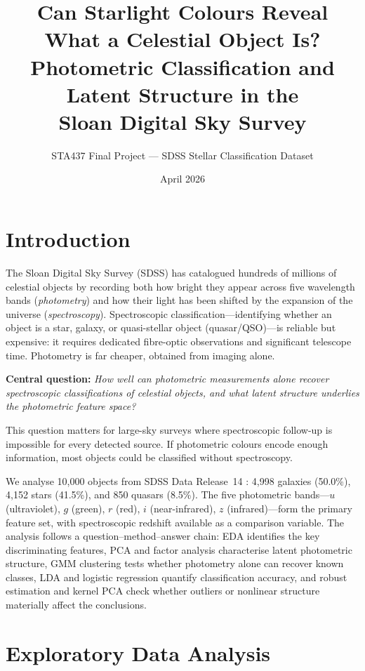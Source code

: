\documentclass[12pt]{article}
\title{\textbf{Can Starlight Colours Reveal What a Celestial Object Is?}\\
\large Photometric Classification and Latent Structure in the\\
Sloan Digital Sky Survey}
\author{STA437 Final Project --- SDSS Stellar Classification Dataset}
\date{April 2026}
\begin{document}
\maketitle
\thispagestyle{fancy}

\section{Introduction}

The Sloan Digital Sky Survey (SDSS) has catalogued hundreds of millions of celestial objects
by recording both how bright they appear across five wavelength bands
(\emph{photometry}) and how their light has been shifted by the expansion of the universe
(\emph{spectroscopy}). Spectroscopic classification---identifying whether an object is a star,
galaxy, or quasi-stellar object (quasar/QSO)---is reliable but expensive: it requires dedicated
fibre-optic observations and significant telescope time. Photometry is far cheaper, obtained
from imaging alone.

\textbf{Central question:} \emph{How well can photometric measurements alone recover
spectroscopic classifications of celestial objects, and what latent structure underlies the
photometric feature space?}

This question matters for large-sky surveys where spectroscopic follow-up is impossible for
every detected source. If photometric colours encode enough information, most objects could
be classified without spectroscopy.

We analyse 10,000 objects from SDSS Data Release~14 \citep{abolfathi2018sdss}: 4,998
galaxies (50.0\%), 4,152 stars (41.5\%), and 850 quasars (8.5\%). The five photometric
bands---$u$ (ultraviolet), $g$ (green), $r$ (red), $i$ (near-infrared), $z$ (infrared)---form the
primary feature set, with spectroscopic redshift available as a comparison variable.
The analysis follows a question--method--answer chain: EDA identifies the key discriminating
features, PCA and factor analysis characterise latent photometric structure, GMM clustering
tests whether photometry alone can recover known classes, LDA and logistic regression
quantify classification accuracy, and robust estimation and kernel PCA check whether
outliers or nonlinear structure materially affect the conclusions.

\section{Exploratory Data Analysis}
\end{document}
